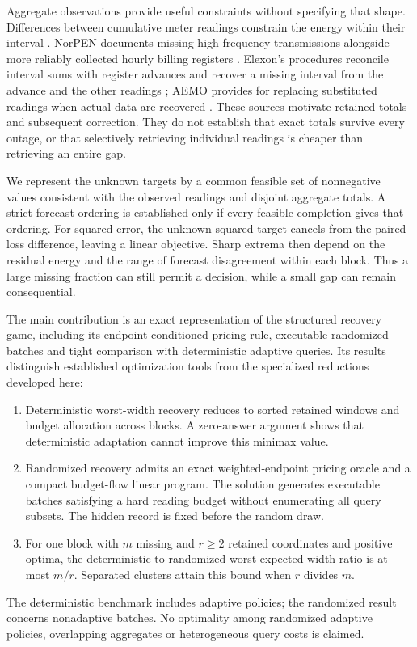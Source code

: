 \documentclass[12pt]{article}
\begin{document}
Aggregate observations provide useful constraints without specifying that
shape. Differences between cumulative meter readings constrain the energy
within their interval \cite{canada}. NorPEN documents missing high-frequency
transmissions alongside more reliably collected hourly billing registers
\cite{norpen}. Elexon's procedures reconcile interval sums with register
advances and recover a missing interval from the advance and the other
readings \cite{elexon}; AEMO provides for replacing substituted readings
when actual data are recovered \cite{aemo}. These sources motivate retained
totals and subsequent correction. They do not establish that exact totals
survive every outage, or that selectively retrieving individual readings
is cheaper than retrieving an entire gap.

We represent the unknown targets by a common feasible set of nonnegative
values consistent with the observed readings and disjoint aggregate totals.
A strict forecast ordering is established only if every feasible completion
gives that ordering. For squared error, the unknown squared target cancels
from the paired loss difference, leaving a linear objective. Sharp extrema
then depend on the residual energy and the range of forecast disagreement
within each block. Thus a large missing fraction can still permit a decision,
while a small gap can remain consequential.

The main contribution is an exact representation of the structured
recovery game, including its endpoint-conditioned pricing rule, executable
randomized batches and tight comparison with deterministic adaptive queries. Its results distinguish established optimization
tools from the specialized reductions developed here:
\begin{enumerate}
\item Deterministic worst-width recovery reduces to sorted retained windows
and budget allocation across blocks. A zero-answer argument shows that
deterministic adaptation cannot improve this minimax value.
\item Randomized recovery admits an exact weighted-endpoint pricing oracle
and a compact budget-flow linear program. The solution generates executable
batches satisfying a hard reading budget without enumerating all query
subsets. The hidden record is fixed before the random draw.
\item For one block with $m$ missing and $r\geq2$ retained coordinates and positive optima,
the deterministic-to-randomized worst-expected-width ratio is at most $m/r$.
Separated clusters attain this bound when $r$ divides $m$.
\end{enumerate}
The deterministic benchmark includes adaptive policies; the randomized
result concerns nonadaptive batches. No optimality among randomized
adaptive policies, overlapping aggregates or heterogeneous query costs
is claimed.
\end{document}
